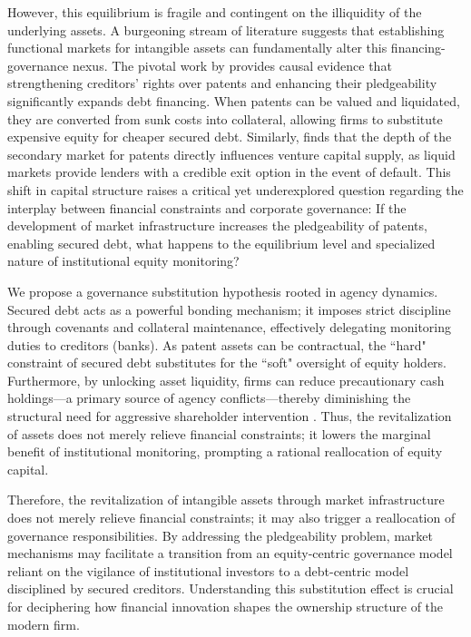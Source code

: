 \documentclass[12pt,a4paper]{article}
\begin{document}
However, this equilibrium is fragile and contingent on the illiquidity of the underlying assets. A burgeoning stream of literature suggests that establishing functional markets for intangible assets can fundamentally alter this financing-governance nexus. The pivotal work by \cite{mann2018creditor} provides causal evidence that strengthening creditors' rights over patents and enhancing their pledgeability significantly expands debt financing. When patents can be valued and liquidated, they are converted from sunk costs into collateral, allowing firms to substitute expensive equity for cheaper secured debt. Similarly, \cite{hochberg2018patent} finds that the depth of the secondary market for patents directly influences venture capital supply, as liquid markets provide lenders with a credible exit option in the event of default. This shift in capital structure raises a critical yet underexplored question regarding the interplay between financial constraints and corporate governance: If the development of market infrastructure increases the pledgeability of patents, enabling secured debt, what happens to the equilibrium level and specialized nature of institutional equity monitoring?

We propose a governance substitution hypothesis rooted in agency dynamics. Secured debt acts as a powerful bonding mechanism; it imposes strict discipline through covenants and collateral maintenance, effectively delegating monitoring duties to creditors (banks). As patent assets can be contractual, the ``hard" constraint of secured debt substitutes for the ``soft" oversight of equity holders. Furthermore, by unlocking asset liquidity, firms can reduce precautionary cash holdings—a primary source of agency conflicts—thereby diminishing the structural need for aggressive shareholder intervention \citep{oswald2008share,favara2021uncertainty}. Thus, the revitalization of assets does not merely relieve financial constraints; it lowers the marginal benefit of institutional monitoring, prompting a rational reallocation of equity capital.

Therefore, the revitalization of intangible assets through market infrastructure does not merely relieve financial constraints; it may also trigger a reallocation of governance responsibilities. By addressing the pledgeability problem, market mechanisms may facilitate a transition from an equity-centric governance model reliant on the vigilance of institutional investors to a debt-centric model disciplined by secured creditors. Understanding this substitution effect is crucial for deciphering how financial innovation shapes the ownership structure of the modern firm.
\end{document}
